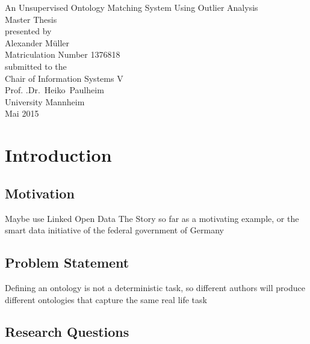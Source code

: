 \documentclass[11pt,titlepage,oneside,openany,a4paper]{report}
\begin{document}
\begin{titlepage}
	\vspace*{2cm}
  \begin{center}
   {\Large An Unsupervised Ontology Matching System Using Outlier Analysis \\}
   \vspace{2cm}
   {Master Thesis\\}
   \vspace{2cm}
   {presented by\\
 	 Alexander Müller \\
    Matriculation Number 1376818\\
   }
   \vspace{1cm}
   {submitted to the\\
  	Chair of Information Systems V\\
  	 Prof. .Dr.\ Heiko\ Paulheim \\
    University Mannheim\\} \vspace{2cm}
   {Mai 2015}
  \end{center}
\end{titlepage}
\tableofcontents
\newpage

\listoffigures

\listoftables

\newpage
{}
\chapter{Introduction}
	\section{Motivation}
	Maybe use Linked Open Data The Story so far as a motivating example, or the smart data initiative of the federal government of Germany
	\section{Problem Statement}
	Defining an ontology is not a deterministic task, so different authors will produce different ontologies that capture the same real life task
	\section{Research Questions}
	
\end{document}
